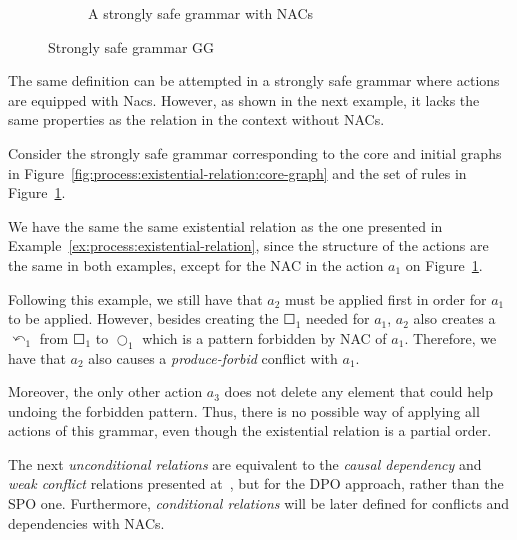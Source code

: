 \begin{example}
\begin{figure}[!ht]
\begin{subfigure}[t]{.5\textwidth}
    \caption{A strongly safe grammar with NACs}\label{fig:process:existential-relation:example-nacs}
  \end{subfigure}
  \caption{Strongly safe grammar GG}\label{fig:process:existential-relation}
\end{figure}
\end{example}

The same definition can be attempted in a strongly safe grammar where actions are equipped with Nacs. However, as shown in the next example, it lacks the same properties as the relation in the context without NACs.

\begin{example}\label{ex:process:existential-relation-fail}Consider the strongly safe grammar corresponding to the core and initial graphs in Figure~\ref{fig:process:existential-relation:core-graph} and the set of rules in Figure~\ref{fig:process:existential-relation:example-nacs}. 
  
  We have the same the same existential relation as the one presented in Example~\ref{ex:process:existential-relation}, since the structure of the actions are the same in both examples, except for the NAC in the action $a_1$ on Figure~\ref{fig:process:existential-relation:example-nacs}.

  Following this example, we still have that $a_2$ must be applied first in order for $a_1$ to be applied. However, besides creating the $\Square_1$ needed for $a_1$, $a_2$ also creates a $\curvearrowleft_1$ from $\Square_1$ to $\Circle_1$ which is a pattern forbidden by NAC of $a_1$. Therefore, we have that $a_2$ also causes a \emph{produce-forbid} conflict with $a_1$.

  Moreover, the only other action $a_3$ does not delete any element that could help undoing the forbidden pattern. Thus, there is no possible way of applying all actions of this grammar, even though the existential relation is a partial order.

\end{example}

The next \emph{unconditional relations} are equivalent to the \emph{causal dependency} and \emph{weak conflict} relations presented at~\cite{Ribeiro1996}, but for the DPO approach, rather than the SPO one. Furthermore, \emph{conditional relations} will be later defined for conflicts and dependencies with NACs.

